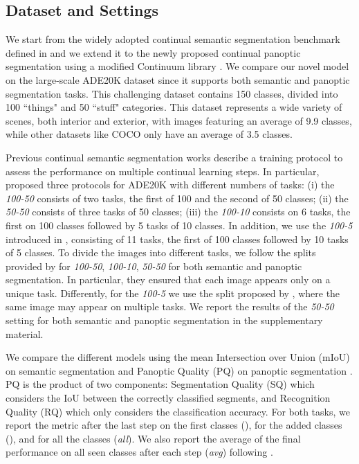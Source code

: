 \documentclass[10pt,twocolumn,letterpaper]{article}
\begin{document}
 
\subsection{Dataset and Settings}
We start from the widely adopted continual semantic segmentation benchmark defined in \cite{cermelli2020modelingthebackground} and we extend it to the newly proposed continual panoptic segmentation using a modified Continuum library \cite{douillardlesort2021continuum}. 
We compare our novel model on the large-scale ADE20K \cite{zhou2017adedataset} dataset since it supports both semantic and panoptic segmentation tasks. This challenging dataset contains 150 classes, divided into 100 “things" and 50 “stuff" categories. This dataset represents a wide variety of scenes, both interior and exterior, with images featuring an average of 9.9 classes, while other datasets like COCO \cite{lin2014mscocodataset} only have an average of 3.5 classes.

Previous continual semantic segmentation works \cite{douillard2020plop, cermelli2020modelingthebackground} describe a training protocol to assess the performance on multiple continual learning steps. In particular, \cite{cermelli2020modelingthebackground} proposed three protocols for ADE20K with different numbers of tasks: (i) the \textit{100-50} consists of two tasks, the first of 100 and the second of 50 classes; (ii) the \textit{50-50} consists of three tasks of 50 classes; (iii) the \textit{100-10} consists on 6 tasks, the first on 100 classes followed by 5 tasks of 10 classes. In addition, we use the \textit{100-5} introduced in \cite{douillard2020plop}, consisting of 11 tasks, the first of 100 classes followed by 10 tasks of 5 classes.
To divide the images into different tasks, we follow the splits provided by \cite{cermelli2020modelingthebackground} for \textit{100-50}, \textit{100-10}, \textit{50-50} for both semantic and panoptic segmentation. In particular, they ensured that each image appears only on a unique task. Differently, for the \textit{100-5} we use the split proposed by \cite{douillard2020plop}, where the same image may appear on multiple tasks. 
We report the results of the \textit{50-50} setting for both semantic and panoptic segmentation in the supplementary material.

We compare the different models using the mean Intersection over Union (mIoU) on semantic segmentation \cite{everingham2015pascalvoc} and Panoptic Quality (PQ) on panoptic segmentation \cite{kirillov2019panoptic}. PQ is the product of two components: Segmentation Quality (SQ) which considers the IoU between the correctly classified segments, and Recognition Quality (RQ) which only considers the classification accuracy. For both tasks, we report the metric after the last step  on the first classes (), for the added classes (), and for all the classes (\textit{all}). We also report the average of the final performance on all seen classes after each step (\textit{avg}) following \cite{douillard2020plop}.
\end{document}
